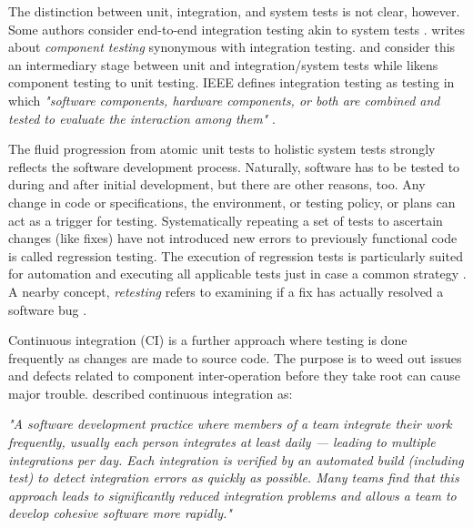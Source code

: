 \documentclass[12pt,a4paper,oneside,pdftex]{report}
\begin{document}
The distinction between unit, integration, and system tests is not clear, however. Some authors consider end-to-end integration testing akin to system tests \citep{tsai2001end, paul2001end}. \citet{duvall2007continuous} writes about \emph{component testing} synonymous with integration testing. \citet{pezze2008software} and \citet{benz2007combining} consider this an intermediary stage between unit and integration/system tests while \citet{burnstein2003practical} likens component testing to unit testing. IEEE defines integration testing as testing in which \emph{"software components, hardware components, or both are combined and tested to evaluate the interaction among them"} \citep{ieee2010systems}.

The fluid progression from atomic unit tests to holistic system tests strongly reflects the software development process. Naturally, software has to be tested to during and after initial development, but there are other reasons, too. Any change in code or specifications, the environment, or testing policy, or plans can act as a trigger for testing. Systematically repeating a set of tests to ascertain changes (like fixes) have not introduced new errors to previously functional code is called regression testing. The execution of regression tests is particularly suited for automation and executing all applicable tests just in case a common strategy \citep{jenkins2008software, pezze2008software}. A nearby concept, \textit{retesting} refers to examining if a fix has actually resolved a software bug \citep{jenkins2008software}.

Continuous integration (CI) is a further approach where testing is done frequently as changes are made to source code. The purpose is to weed out issues and defects related to component inter-operation before they take root can cause major trouble. \citet{fowler2006continuous} described continuous integration as:

\begin{adjustwidth}{2.5em}{0pt}
\small
\emph{"A software development practice where members of a team integrate their work frequently, usually each person integrates at least daily --- leading to multiple integrations per day. Each integration is verified by an automated build (including test) to detect integration errors as quickly as possible. Many teams find that this approach leads to significantly reduced integration problems and allows a team to develop cohesive software more rapidly."}
\normal
\end{adjustwidth}
\end{document}
